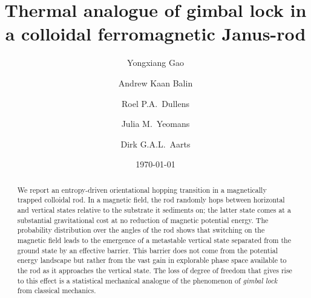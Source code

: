 \documentclass[aps,prl,twocolumn,superscriptaddress]{revtex4-1}
\begin{document}

\title{Thermal analogue of gimbal lock in a colloidal ferromagnetic Janus-rod}


\author{Yongxiang Gao}
\author{Andrew Kaan Balin}
\author{Roel P.A.\ Dullens}
\author{Julia M.\ Yeomans}
\author{Dirk G.A.L.\ Aarts}



\date{\today}

\begin{abstract} We report an entropy-driven orientational hopping transition in a magnetically trapped colloidal rod. In a magnetic field, the rod randomly hops between horizontal and vertical states relative to the substrate it sediments on; the latter state comes at a substantial gravitational cost at no reduction of magnetic potential energy. The probability distribution over the angles of the rod shows that switching on the magnetic field leads to the emergence of a metastable vertical state separated from the ground state by an effective barrier. This barrier does not come from the potential energy landscape but rather from the vast gain in explorable phase space available to the rod as it approaches the vertical state. The loss of degree of freedom that gives rise to this effect is a statistical mechanical analogue of the phenomenon of \emph{gimbal lock} from classical mechanics.\end{abstract}
\end{document}
